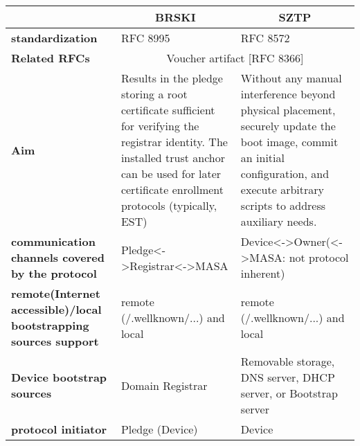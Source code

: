
\begin{landscape}
\begin{longtable}[!htbp]{|p{4cm}|l|l|}
		\hline
		\rowcolor[rgb]{ .745,  .804,  .843} \multicolumn{1}{|c|}{} & \multicolumn{1}{c|}{\textbf{BRSKI}} & \multicolumn{1}{c|}{\textbf{SZTP}} \bigstrut\\
		\hline
		\endhead
		\rowcolor[rgb]{ .745,  .804,  .843} \textbf{standardization} & \cellcolor[rgb]{ 1,  1,  1}RFC 8995 & \cellcolor[rgb]{ 1,  1,  1}RFC 8572 \bigstrut\\
		\hline
		\rowcolor[rgb]{ .745,  .804,  .843} \textbf{Related RFCs} & \multicolumn{2}{c|}{\cellcolor[rgb]{ 1,  1,  1}Voucher artifact [RFC 8366]} \bigstrut\\
		\hline
		\rowcolor[rgb]{ .745,  .804,  .843} \textbf{Aim} & \multicolumn{1}{p{18.335em}|}{\cellcolor[rgb]{ 1,  1,  1}Results in the pledge storing a root certificate sufficient for verifying the registrar identity. The installed trust anchor can be used for later certificate enrollment protocols (typically, EST)} & \multicolumn{1}{p{18.335em}|}{\cellcolor[rgb]{ 1,  1,  1}Without any manual interference beyond physical placement, securely update the boot image, commit an initial configuration, and execute arbitrary scripts to address auxiliary needs.} \bigstrut\\
		\hline
		\rowcolor[rgb]{ .745,  .804,  .843} \textbf{communication channels covered by the protocol} & \cellcolor[rgb]{ 1,  1,  1}Pledge<->Registrar<->MASA & \multicolumn{1}{p{18.335em}|}{\cellcolor[rgb]{ 1,  1,  1}Device<->Owner(<->MASA: not protocol inherent)} \bigstrut\\
		\hline
		\rowcolor[rgb]{ .745,  .804,  .843} \textbf{remote(Internet accessible)/local bootstrapping sources support} & \cellcolor[rgb]{ 1,  1,  1}remote (/.wellknown/...) and local & \cellcolor[rgb]{ 1,  1,  1}remote (/.wellknown/...) and local \bigstrut\\
		\hline
		\rowcolor[rgb]{ .745,  .804,  .843} \textbf{Device bootstrap sources} & \cellcolor[rgb]{ 1,  1,  1}Domain Registrar & \multicolumn{1}{p{18.335em}|}{\cellcolor[rgb]{ 1,  1,  1}Removable storage, DNS server, DHCP server, or Bootstrap server} \bigstrut\\
		\hline
		\rowcolor[rgb]{ .745,  .804,  .843} \textbf{protocol initiator} & \cellcolor[rgb]{ 1,  1,  1}Pledge (Device) & \cellcolor[rgb]{ 1,  1,  1}Device \bigstrut\\
		\hline

\end{longtable}
\end{landscape}
